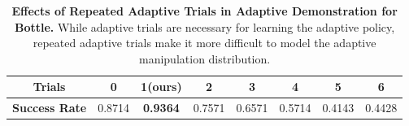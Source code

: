 \begin{table}[h]
\caption{\textbf{Effects of Repeated Adaptive Trials in Adaptive Demonstration for Bottle.} While adaptive trials are necessary for learning the adaptive policy, repeated adaptive trials make it more difficult to model the adaptive manipulation distribution.}
  \label{tab:tails}
  \centering
  \begin{tabular}{cccccccc}
    \toprule
    \textbf{Trials} & 0 & 1(ours) &
    2 & 3 & 4 & 5 & 6\\
    \toprule
    \textbf{Success Rate} & 0.8714  & \textbf{0.9364}  & 0.7571 & 0.6571 & 0.5714 & 0.4143 & 0.4428\\
    \bottomrule
  \end{tabular}
\end{table}